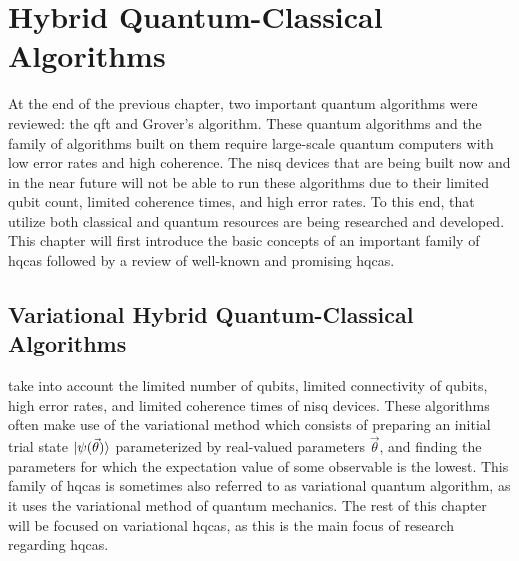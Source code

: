 \chapter[Hybrid Quantum-Classical Algorithms]{Hybrid Quantum-Classical\\Algorithms} \label{chap:hybrid-quantum-classical-algorithms}
At the end of the previous chapter, two important quantum algorithms were reviewed: the \gls{qft} and Grover's algorithm.
These quantum algorithms and the family of algorithms built on them require large-scale quantum computers with low error rates and high coherence.
The \gls{nisq} devices that are being built now and in the near future will not be able to run these algorithms due to their limited qubit count, limited coherence times, and high error rates.
To this end,  that utilize both classical and quantum resources are being researched and developed.
This chapter will first introduce the basic concepts of an important family of \glspl{hqca} followed by a review of well-known and promising \glspl{hqca}.

\section{Variational Hybrid Quantum-Classical Algorithms}
 take into account the limited number of qubits, limited connectivity of qubits, high error rates, and limited coherence times of \gls{nisq} devices.
These algorithms often make use of the variational method which consists of preparing an initial trial state $\vert{\psi(\vec{\theta})}\rangle$ parameterized by real-valued parameters $\vec{\theta}$, and finding the parameters for which the expectation value of some observable is the lowest.
This family of \glspl{hqca} is sometimes also referred to as variational quantum algorithm, as it uses the variational method of quantum mechanics.
The rest of this chapter will be focused on variational \glspl{hqca}, as this is the main focus of research regarding \glspl{hqca}.

